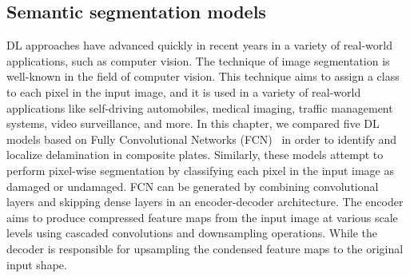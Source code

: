 \subsection{Semantic segmentation models}
\label{section:semantic_segmentation}
DL approaches have advanced quickly in recent years in a variety of real-world applications, such as computer vision.
The technique of image segmentation is well-known in the field of computer vision.
This technique aims to assign a class to each pixel in the input image, and it is used in a variety of real-world applications like self-driving automobiles, medical imaging, traffic management systems, video surveillance, and more.
In this chapter, we compared five DL models based on Fully Convolutional Networks (FCN)~\cite{Shelhamer2017a} in order to identify and localize delamination in composite plates.
Similarly, these models attempt to perform pixel-wise segmentation by classifying each pixel in the input image as damaged or undamaged.
FCN can be generated by combining convolutional layers and skipping dense layers in an encoder-decoder architecture.
The encoder aims to produce compressed feature maps from the input image at various scale levels using cascaded convolutions and downsampling operations.
While the decoder is responsible for upsampling the condensed feature maps to the original input shape.

